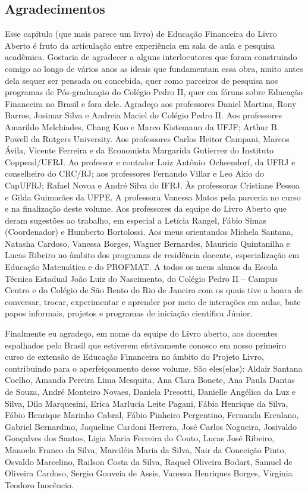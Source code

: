 \begin{apresentacao}

\section{Agradecimentos}

Esse capítulo (que mais parece um livro) de Educação Financeira do Livro Aberto é fruto da articulação entre experiência em sala de aula e pesquisa acadêmica. Gostaria de agradecer a alguns interlocutores que foram construindo comigo ao longo de vários anos as ideais que fundamentam essa obra, muito antes dela sequer ser pensada ou concebida, quer como parceiros de pesquisa nos programas de Pós-graduação do Colégio Pedro II, quer em fóruns sobre Educação Financeira no Brasil e fora dele. Agradeço aos professores Daniel Martins, Rony Barros, Josimar Silva e Andreia Maciel do Colégio Pedro II. Aos professores Amarildo Melchiades, Chang Kuo e Marco Kistemann da UFJF; Arthur B. Powell da Rutgers University. Aos professores Carlos Heitor Campani, Marcos Ávila, Vicente Ferreira e da Economista Margarida Gutierrez do Instituto Coppead/UFRJ. Ao professor e contador Luiz Antônio Ochsendorf, da UFRJ e conselheiro do CRC/RJ; aos professores Fernando Villar e Leo Akio do CapUFRJ; Rafael Novoa e André Silva do IFRJ. Às professoras Cristiane Pessoa e Gilda Guimarães da UFPE. A professora Vanessa Matos pela parceria no curso e na finalização deste
volume. Aos professores da equipe do Livro Aberto que deram sugestões ao trabalho, em especial a Letícia Rangel, Fábio Simas (Coordenador) e Humberto Bortolossi. Aos meus orientandos Michela Santana, Natasha Cardoso, Vanessa Borges, Wagner Bernardes, Mauricio Quintanilha e Lucas Ribeiro no âmbito dos programas de residência docente, especialização em Educação Matemática e do PROFMAT. A todos os meus alunos da Escola Técnica Estadual João Luiz do Nascimento, do Colégio Pedro II – Campus Centro e do Colégio de São Bento do Rio de Janeiro com os quais tive a honra de conversar, trocar, experimentar e aprender por meio de interações em aulas, bate papos informais, projetos e programas de iniciação científica Júnior. 

Finalmente eu agradeço, em nome da equipe do Livro aberto, aos docentes espalhados pelo Brasil que estiverem efetivamente conosco em nosso primeiro curso de extensão de Educação Financeira no âmbito do Projeto Livro, contribuindo para o aperfeiçoamento desse volume. São eles(elas): Aldair Santana Coelho, Amanda Pereira Lima Mesquita, Ana Clara Bonete, Ana
Paula Dantas de Souza, André Monteiro Novaes, Daniela Presotti, Danielle Angélica da Luz e Silva, Dilo Marquesini, Erica Marlucia Leite Pagani, Fábio Henrique da Silva, Fábio Henrique Marinho Cabral, Fábio Pinheiro Pergentino, Fernanda Erculano, Gabriel Bernardino, Jaqueline Cardoni Herrera, José Carlos Nogueira, Josivaldo Gonçalves dos Santos, Ligia Maria Ferreira do Couto, Lucas José Ribeiro, Manoela Franco da Silva, Marciléia Maria da Silva, Nair da Conceição Pinto, Osvaldo Marcelino, Railson Costa da Silva, Raquel Oliveira Bodart, Samuel de Oliveira Cardoso, Sergio Gouveia de Assis, Vanessa Henriques Borges, Virginia Teodoro Inocêncio.



\end{apresentacao}
